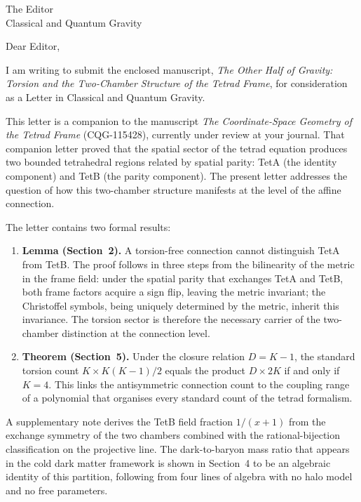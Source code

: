 \documentclass[11pt]{letter}
\begin{document}
\begin{letter}{The Editor\\Classical and Quantum Gravity}

\opening{Dear Editor,}

I am writing to submit the enclosed manuscript,
\textit{The Other Half of Gravity: Torsion and the
Two-Chamber Structure of the Tetrad Frame}, for
consideration as a Letter in Classical and Quantum Gravity.

This letter is a companion to the manuscript
\textit{The Coordinate-Space Geometry of the Tetrad Frame}
(CQG-115428), currently under review at your journal.
That companion letter proved that the spatial sector of the
tetrad equation produces two bounded tetrahedral regions
related by spatial parity: TetA (the identity component) and
TetB (the parity component). The present letter addresses
the question of how this two-chamber structure manifests at
the level of the affine connection.

The letter contains two formal results:

\begin{enumerate}

\item \textbf{Lemma (Section~2).} A torsion-free connection
cannot distinguish TetA from TetB. The proof follows in three
steps from the bilinearity of the metric in the frame field:
under the spatial parity that exchanges TetA and TetB, both
frame factors acquire a sign flip, leaving the metric
invariant; the Christoffel symbols, being uniquely determined
by the metric, inherit this invariance. The torsion sector is
therefore the necessary carrier of the two-chamber distinction
at the connection level.

\item \textbf{Theorem (Section~5).} Under the closure
relation $D = K - 1$, the standard torsion count
$K \times K(K{-}1)/2$ equals the product $D \times 2K$ if
and only if $K = 4$. This links the antisymmetric connection
count to the coupling range of a polynomial that organises
every standard count of the tetrad formalism.

\end{enumerate}

A supplementary note derives the TetB field fraction
$1/(x{+}1)$ from the exchange symmetry of the two chambers
combined with the rational-bijection classification on the
projective line. The dark-to-baryon mass ratio that appears
in the cold dark matter framework is shown in Section~4 to
be an algebraic identity of this partition, following from
four lines of algebra with no halo model and no free
parameters.


\end{letter}
\end{document}
